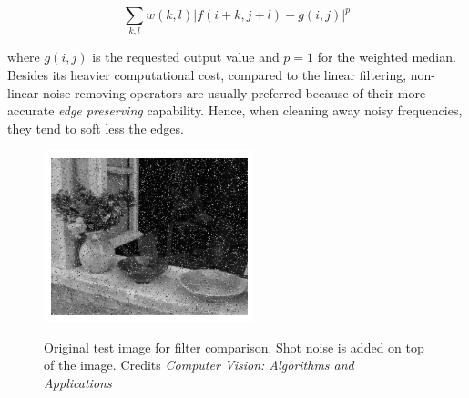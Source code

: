 \begin{equation}
	\label{eqn:weighted-median-filt}
	\sum_{k, l} w(k,l) \vert f(i + k, j + l) - g(i, j) \vert^{p}
\end{equation}

where $g(i,j)$ is the requested output value and $p = 1$ for the weighted median. \\
Besides its heavier computational cost, compared to the linear filtering, non-linear noise removing operators are usually preferred because of their more accurate \textit{edge preserving} capability. 
Hence, when cleaning away noisy frequencies, they tend to soft less the edges.\\

\begin{figure}[t]
	\begin{center}
		{\includegraphics[width=.8\textwidth, height= 5cm, keepaspectratio]{images/filter-example-original-shot-noise.png}}
\caption{Original test image for filter comparison. Shot noise is added on top of the image. Credits \textit{Computer Vision: Algorithms and Applications}~\cite{Szeliski2011}}
\label{fig:filter-example-original}
	\end{center}
\end{figure}

